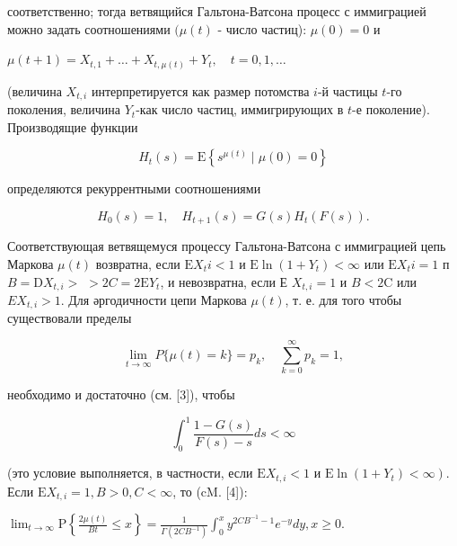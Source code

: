 \documentclass[10pt]{article}
\begin{document}
соответственно; тогда ветвящийся Гальтона-Ватсона процесс с иммиграцией можно задать соотношениями $(\mu(t)$ - число частиц): $\mu(0)=0$ и



$\mu(t+1)=X_{t, 1}+\ldots+X_{t, \mu(t)}+Y_{t}, \quad t=0,1, \ldots$



(величина $X_{t, i}$ интерпретируется как размер потомства $i$-й частицы $t$-го поколения, величина $Y_{t}$-как число частиц, иммигрирующих в $t$-е поколение). Производящие функции



\[

H_{t}(s)=\mathrm{E}\left\{s^{\mu(t)} \mid \mu(0)=0\right\}

\]



определяются рекуррентными соотношениями



\[

H_{0}(s)=1, \quad H_{t+1}(s)=G(s) H_{t}(F(s)) .

\]



Соответствующая ветвящемуся процессу Гальтона-Ватсона с иммиграцией цепь Маркова $\mu(t)$ возвратна, если $\mathrm{E} X_{t} i<1$ и $\mathrm{E} \ln \left(1+Y_{t}\right)<\infty$ или $\mathrm{E} X_{t} i=1$ п $B=\mathrm{D} X_{t, i}>$ $>2 C=2 \mathrm{E} Y_{t}$, и невозвратна, если Е $X_{t, i}=1$ и $B<2 \mathrm{C}$ или $E X_{t, i}>1$. Для әргодичности цепи Маркова $\mu(t)$, т. е. для того чтобы существовали пределы



\[

\lim _{t \rightarrow \infty} P\{\mu(t)=k\}=p_{k}, \quad \sum_{k=0}^{\infty} p_{k}=1,

\]



необходимо и достаточно (см. [3]), чтобы



\[

\int_{0}^{1} \frac{1-G(s)}{F(s)-s} d s<\infty

\]



(это условие выполняется, в частности, если $\mathrm{E} X_{t, i}<1$ и $\left.\mathrm{E} \ln \left(1+Y_{t}\right)<\infty\right)$. Если $\mathrm{E} X_{t, i}=1, B>0, C<\infty$, то (cM. [4]):



$\lim _{t \rightarrow \infty} \mathrm{P}\left\{\frac{2 \mu(t)}{B t} \leqslant x\right\}=\frac{1}{\Gamma\left(2 C B^{-1}\right)} \int_{0}^{x} y^{2 C B^{-1}-1} e^{-y} d y, x \geqslant 0$.
\end{document}
